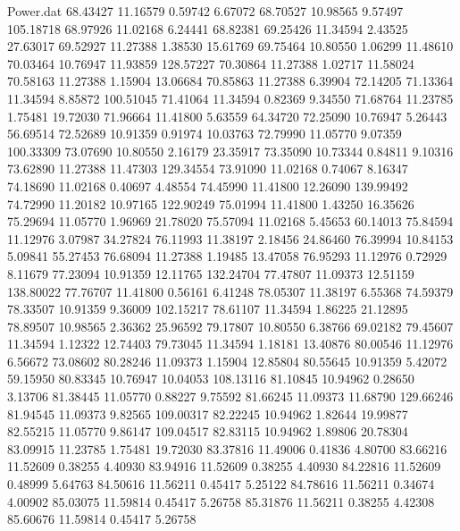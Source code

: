 \begin{filecontents}{Power.dat}
  68.43427   11.16579    0.59742    6.67072
  68.70527   10.98565    9.57497  105.18718
  68.97926   11.02168    6.24441   68.82381
  69.25426   11.34594    2.43525   27.63017
  69.52927   11.27388    1.38530   15.61769
  69.75464   10.80550    1.06299   11.48610
  70.03464   10.76947   11.93859  128.57227
  70.30864   11.27388    1.02717   11.58024
  70.58163   11.27388    1.15904   13.06684
  70.85863   11.27388    6.39904   72.14205
  71.13364   11.34594    8.85872  100.51045
  71.41064   11.34594    0.82369    9.34550
  71.68764   11.23785    1.75481   19.72030
  71.96664   11.41800    5.63559   64.34720
  72.25090   10.76947    5.26443   56.69514
  72.52689   10.91359    0.91974   10.03763
  72.79990   11.05770    9.07359  100.33309
  73.07690   10.80550    2.16179   23.35917
  73.35090   10.73344    0.84811    9.10316
  73.62890   11.27388   11.47303  129.34554
  73.91090   11.02168    0.74067    8.16347
  74.18690   11.02168    0.40697    4.48554
  74.45990   11.41800   12.26090  139.99492
  74.72990   11.20182   10.97165  122.90249
  75.01994   11.41800    1.43250   16.35626
  75.29694   11.05770    1.96969   21.78020
  75.57094   11.02168    5.45653   60.14013
  75.84594   11.12976    3.07987   34.27824
  76.11993   11.38197    2.18456   24.86460
  76.39994   10.84153    5.09841   55.27453
  76.68094   11.27388    1.19485   13.47058
  76.95293   11.12976    0.72929    8.11679
  77.23094   10.91359   12.11765  132.24704
  77.47807   11.09373   12.51159  138.80022
  77.76707   11.41800    0.56161    6.41248
  78.05307   11.38197    6.55368   74.59379
  78.33507   10.91359    9.36009  102.15217
  78.61107   11.34594    1.86225   21.12895
  78.89507   10.98565    2.36362   25.96592
  79.17807   10.80550    6.38766   69.02182
  79.45607   11.34594    1.12322   12.74403
  79.73045   11.34594    1.18181   13.40876
  80.00546   11.12976    6.56672   73.08602
  80.28246   11.09373    1.15904   12.85804
  80.55645   10.91359    5.42072   59.15950
  80.83345   10.76947   10.04053  108.13116
  81.10845   10.94962    0.28650    3.13706
  81.38445   11.05770    0.88227    9.75592
  81.66245   11.09373   11.68790  129.66246
  81.94545   11.09373    9.82565  109.00317
  82.22245   10.94962    1.82644   19.99877
  82.55215   11.05770    9.86147  109.04517
  82.83115   10.94962    1.89806   20.78304
  83.09915   11.23785    1.75481   19.72030
  83.37816   11.49006    0.41836    4.80700
  83.66216   11.52609    0.38255    4.40930
  83.94916   11.52609    0.38255    4.40930
  84.22816   11.52609    0.48999    5.64763
  84.50616   11.56211    0.45417    5.25122
  84.78616   11.56211    0.34674    4.00902
  85.03075   11.59814    0.45417    5.26758
  85.31876   11.56211    0.38255    4.42308
  85.60676   11.59814    0.45417    5.26758
\end{filecontents}
